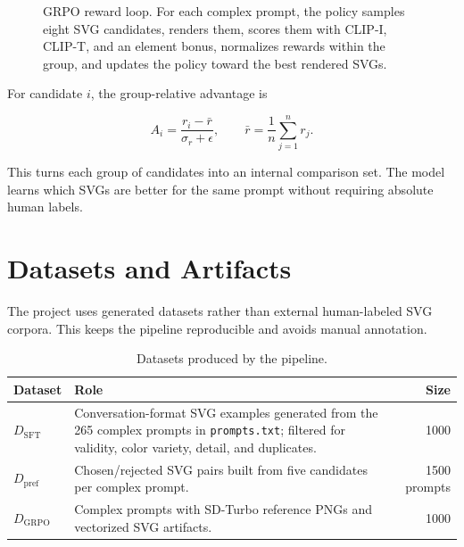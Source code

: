 \documentclass[10pt,twocolumn]{article}
\begin{document}
\begin{figure}[t]
{}
\caption{GRPO reward loop. For each complex prompt, the policy samples eight
SVG candidates, renders them, scores them with CLIP-I, CLIP-T, and an element
bonus, normalizes rewards within the group, and updates the policy toward the
best rendered SVGs.}
\label{fig:grpo}
\end{figure}

For candidate \(i\), the group-relative advantage is

\begin{equation}
A_i = \frac{r_i-\bar r}{\sigma_r+\epsilon},\qquad
\bar r = \frac{1}{n}\sum_{j=1}^{n} r_j.
\end{equation}

This turns each group of candidates into an internal comparison set. The model
learns which SVGs are better for the same prompt without requiring absolute
human labels.

\section{Datasets and Artifacts}

The project uses generated datasets rather than external human-labeled SVG
corpora. This keeps the pipeline reproducible and avoids manual annotation.

\begin{table}[t]
\centering
\caption{Datasets produced by the pipeline.}
\label{tab:datasets}
\begin{tabularx}{\linewidth}{@{}l>{\raggedright\arraybackslash}Xr@{}}
\toprule
\textbf{Dataset} & \textbf{Role} & \textbf{Size} \\
\midrule
\(D_{\mathrm{SFT}}\) &
Conversation-format SVG examples generated from the 265 complex prompts in
\texttt{prompts.txt}; filtered for validity, color variety, detail, and
duplicates. & 1000 \\
\(D_{\mathrm{pref}}\) &
Chosen/rejected SVG pairs built from five candidates per complex prompt. & 1500 prompts \\
\(D_{\mathrm{GRPO}}\) &
Complex prompts with SD-Turbo reference PNGs and vectorized SVG artifacts. & 1000 \\
\bottomrule
\end{tabularx}
\end{table}
\end{document}
